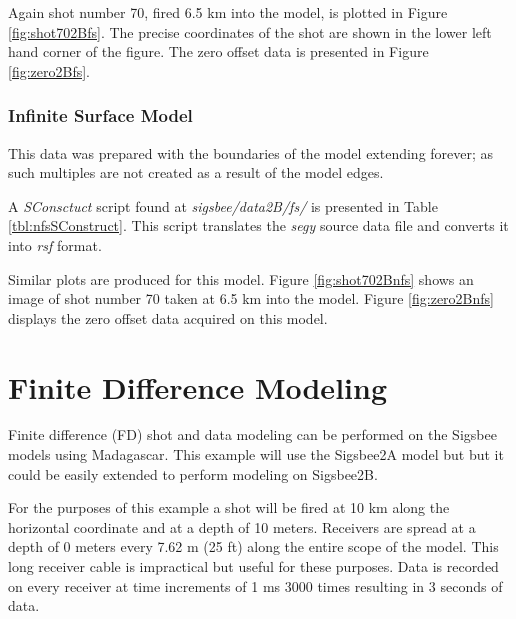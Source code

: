Again shot number 70, fired 6.5 km into the model, is plotted in Figure \ref{fig:shot702Bfs}.  The precise coordinates
of the shot are shown in the lower left hand corner of the figure.  The zero offset data is presented in Figure \ref{fig:zero2Bfs}.     


\subsubsection{Infinite Surface Model}
This data was prepared with the boundaries of the model extending forever; as such multiples are not created as a  result of the model edges.  

A \emph{SConsctuct} script found at \textit{sigsbee/data2B/fs/} is presented in Table \ref{tbl:nfsSConstruct}.  This script 
translates the \emph{segy} source data file and converts it into \emph{rsf} format.  

{
\tiny

\normalsize
}

Similar plots are produced for this model.  Figure \ref{fig:shot702Bnfs} shows an image of shot number 70 taken at 6.5 km into the model.  
Figure \ref{fig:zero2Bnfs} displays the zero offset data acquired on this model.  


\section{Finite Difference Modeling}
Finite difference (FD) shot and data modeling can be performed on the Sigsbee models using Madagascar.  This example will use the Sigsbee2A model
but but it could be easily extended to perform modeling on Sigsbee2B.

For the purposes of this example a shot will be fired at 10 km along the horizontal coordinate and at a depth of 10 meters.  Receivers are
spread at a depth of 0 meters every 7.62 m (25 ft) along the entire scope of the model.  This long receiver cable is impractical but useful for these
purposes.  Data is recorded on every receiver at time increments of 1 ms 3000 times resulting in 3 seconds of data.

